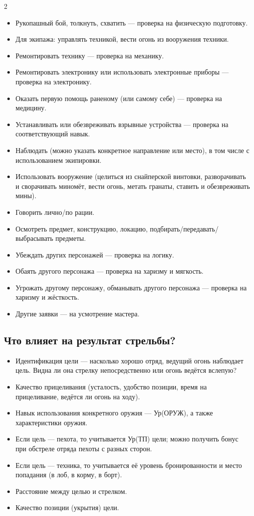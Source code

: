 \documentclass{article}
\begin{document}
\begin{multicols}{2}
\begin{itemize}
\item
  Рукопашный бой, толкнуть, схватить --- проверка на физическую подготовку.
\item
  Для экипажа: управлять техникой, вести огонь из вооружения техники.
\item
  Ремонтировать технику --- проверка на механику.
\item
  Ремонтировать электронику или использовать электронные приборы --- проверка на электронику.
\item
  Оказать первую помощь раненому (или самому себе) --- проверка на медицину.
\item
  Устанавливать или обезвреживать взрывные устройства --- проверка на соответствующий навык.
\item
  Наблюдать (можно указать конкретное направление или место), в том числе с использованием экипировки.
\item
  Использовать вооружение (целиться из снайперской винтовки, разворачивать и сворачивать миномёт, вести огонь, метать гранаты, ставить и обезвреживать мины).
\item
  Говорить лично/по рации.
\item
  Осмотреть предмет, конструкцию, локацию, подбирать/передавать/выбрасывать предметы.
\item
  Убеждать других персонажей --- проверка на логику.
\item
  Обаять другого персонажа --- проверка на харизму и мягкость.
\item
  Угрожать другому персонажу, обманывать другого персонажа --- проверка на харизму и жёсткость.
\item
  Другие заявки --- на усмотрение мастера.
\end{itemize}

\subsection*{Что влияет на результат стрельбы?}\label{what-affects-shooting}

\begin{itemize}
\item
  Идентификация цели --- насколько хорошо отряд, ведущий огонь наблюдает цель. Видна ли она стрелку непосредственно или огонь ведётся вслепую?
\item
  Качество прицеливания (усталость, удобство позиции, время на прицеливание, ведётся ли огонь на ходу).
\item
  Навык использования конкретного оружия --- Ур(ОРУЖ), а также характеристики оружия.
\item
  Если цель --- пехота, то учитывается Ур(ТП) цели; можно получить бонус при обстреле отряда пехоты с разных сторон.
\item
  Если цель --- техника, то учитывается её уровень бронированности и место попадания (в лоб, в корму, в борт).
\item
  Расстояние между целью и стрелком.
\item
  Качество позиции (укрытия) цели.
\end{itemize}


\end{multicols}
\end{document}
